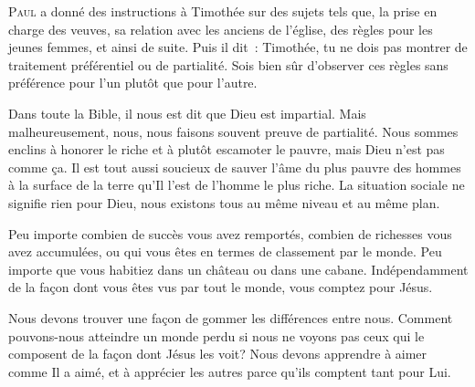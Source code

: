 
\lettrine{P}{aul} a donné des instructions à Timothée
 sur des sujets tels que, la prise en charge des veuves,
 sa relation avec les anciens de l'église, des règles pour les jeunes femmes,
 et ainsi de suite. Puis il dit~: 
 \Og Timothée, 
 tu ne dois pas montrer de traitement préférentiel ou de partialité.
 Sois bien sûr d'observer ces règles sans préférence pour l'un plutôt
 que pour l'autre. \Fg{}

Dans toute la Bible, il nous est dit que Dieu est impartial.
 Mais malheureusement, nous, nous faisons souvent preuve de partialité.
 Nous sommes enclins à honorer le riche et à plutôt escamoter le pauvre,
 mais Dieu n'est pas comme \c{c}a. Il est tout aussi soucieux de sauver l'âme
 du plus pauvre des hommes à la surface de la terre qu'Il l'est de l'homme
 le plus riche. La situation sociale ne signifie rien pour Dieu,
 nous existons tous au même niveau et au même plan. 


Peu importe combien de succès vous avez remportés, combien de richesses
 vous avez accumulées, ou qui vous êtes en termes de classement par le monde.
 Peu importe que vous habitiez dans un château ou dans une cabane.
 Indépendamment de la fa\c{c}on dont vous êtes vus par tout le monde,
 vous comptez pour Jésus. 

Nous devons trouver une fa\c{c}on de gommer les différences entre nous.
 Comment pouvons-nous atteindre un monde perdu si nous ne voyons pas
 ceux qui le composent de la fa\c{c}on dont Jésus les voit?
 Nous devons apprendre à aimer comme Il a aimé, et à apprécier les autres
 parce qu'ils comptent tant pour Lui.

\dvrule







